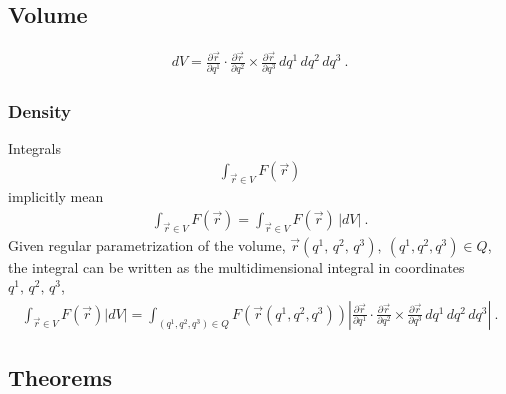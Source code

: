 \documentclass[letterpaper,10pt,english]{jupyterBook}
\begin{document}
\subsection{Volume}
\label{\detokenize{ch/tensor-algebra-calculus/calculus-euclidean:volume}}\label{\detokenize{ch/tensor-algebra-calculus/calculus-euclidean:tensor-calculus-integrals-volume}}\begin{equation*}
\begin{split}dV = \frac{\partial \vec{r}}{\partial q^1} \cdot \frac{\partial \vec{r}}{\partial q^2} \times \frac{\partial \vec{r}}{\partial q^3} \, dq^1 \, dq^2 \, d q^3 \ . \end{split}
\end{equation*}

\subsubsection{Density}
\label{\detokenize{ch/tensor-algebra-calculus/calculus-euclidean:tensor-calculus-integrals-volume-density}}\label{\detokenize{ch/tensor-algebra-calculus/calculus-euclidean:id2}}
\sphinxAtStartPar
Integrals
\begin{equation*}
\begin{split}\int_{\vec{r} \in V} F(\vec{r})\end{split}
\end{equation*}
\sphinxAtStartPar
implicitly mean
\begin{equation*}
\begin{split}\int_{\vec{r} \in V} F(\vec{r}) = \int_{\vec{r} \in V} F(\vec{r}) \, |dV| \ .\end{split}
\end{equation*}
\sphinxAtStartPar
Given regular parametrization of the volume, \(\vec{r}(q^1, \, q^2, \, q^3), \ (q^1, q^2, q^3) \in Q\), the integral can be written as the multi\sphinxhyphen{}dimensional integral in coordinates \(q^1, \, q^2, \, q^3\),
\begin{equation*}
\begin{split}\int_{\vec{r} \in V} F(\vec{r}) |d V| = \int_{(q^1,q^2,q^3) \in Q} F(\vec{r}(q^1,q^2,q^3))  \left| \frac{\partial \vec{r}}{\partial q^1} \cdot \frac{\partial \vec{r}}{\partial q^2} \times \frac{\partial \vec{r}}{\partial q^3} \, dq^1 \, dq^2 \, d q^3 \right| \ .\end{split}
\end{equation*}

\subsection{Theorems}
\label{\detokenize{ch/tensor-algebra-calculus/calculus-euclidean:theorems}}\label{\detokenize{ch/tensor-algebra-calculus/calculus-euclidean:tensor-calculus-integrals-theorems}}
\end{document}

